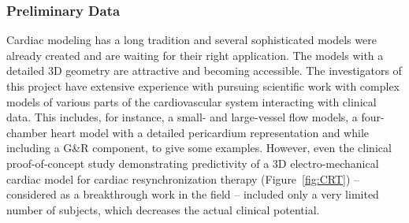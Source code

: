 \subsubsection{Preliminary Data}
Cardiac modeling has a long tradition and several sophisticated models were already created and  are waiting for their right application.  The models with a detailed 3D geometry are attractive and becoming accessible. The investigators of this project have extensive experience  with pursuing scientific work with complex models\cite{chabiniok16} of various parts of the cardiovascular system interacting with clinical data. This includes, for instance, a small- \cite{kovar_LBMperfusion_2026} and large-vessel\cite{jarolimova_AJP2026} flow models, a four-chamber heart model with a detailed pericardium representation\cite{pfaller19a} and while including a G\&R component\cite{gebauer23,pfaller24}, to give some examples. 
However, even the clinical proof-of-concept study
demonstrating predictivity of a 3D  electro-mechanical cardiac model for cardiac resynchronization therapy\cite{sermesant12} (Figure~\ref{fig:CRT})
-- considered as a breakthrough work in the field -- included only a very limited number of subjects, which decreases the actual clinical potential.

